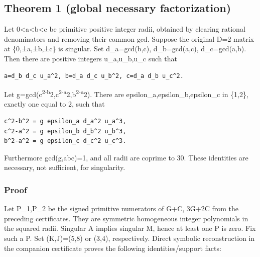 \documentclass[
  10pt,
]{article}
\begin{document}
\subsection{Theorem 1 (global necessary
factorization)}\label{theorem-1-global-necessary-factorization}

Let 0\textless a\textless b\textless c be primitive positive integer
radii, obtained by clearing rational denominators and removing their
common gcd. Suppose the original D=2 matrix at \{0,±a,±b,±c\} is
singular. Set d\_a=gcd(b,c), d\_b=gcd(a,c), d\_c=gcd(a,b). Then there
are positive integers u\_a,u\_b,u\_c such that

\begin{verbatim}
a=d_b d_c u_a^2, b=d_a d_c u_b^2, c=d_a d_b u_c^2.
\end{verbatim}

Let
g=gcd(c\textsuperscript{2-b}2,c\textsuperscript{2-a}2,b\textsuperscript{2-a}2).
There are epsilon\_a,epsilon\_b,epsilon\_c in \{1,2\}, exactly one equal
to 2, such that

\begin{verbatim}
c^2-b^2 = g epsilon_a d_a^2 u_a^3,
c^2-a^2 = g epsilon_b d_b^2 u_b^3,
b^2-a^2 = g epsilon_c d_c^2 u_c^3.
\end{verbatim}

Furthermore gcd(g,abc)=1, and all radii are coprime to 30. These
identities are necessary, not sufficient, for singularity.

\subsubsection{Proof}\label{proof-1}

Let P\_1,P\_2 be the signed primitive numerators of G+C, 3G+2C from the
preceding certificates. They are symmetric homogeneous integer
polynomials in the squared radii. Singular A implies singular M, hence
at least one P is zero. Fix such a P. Set (K,J)=(5,8) or (3,4),
respectively. Direct symbolic reconstruction in the companion
certificate proves the following identities/support facts:
\end{document}
